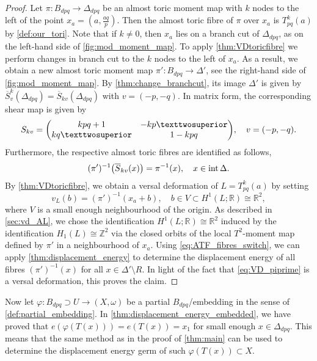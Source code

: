 \documentclass[12pt,a4paper,abstract=true,final]{scrartcl}
\begin{document}
\begin{proof}
    Let $\pi \colon B_{dpq} \rightarrow \Delta_{dpq}$ be an almost toric moment map with $k$ nodes to the left of the point $x_a =\left( a, \frac{aq}{p}\right)$.
Then the almost toric fibre of $\pi$ over $x_a$ is $T^k_{pq}(a)$ by \cref{def:our_tori}.
Note that if $k \neq 0$, then $x_a$ lies on a branch cut of $\Delta_{dpq}$, as on the left-hand side of \cref{fig:mod_moment_map}.
To apply \cref{thm:VDtoricfibre} we perform changes in branch cut to the $k$ nodes to the left of $x_a$.
As a result, we obtain a new almost toric moment map $\pi' \colon B_{dpq} \rightarrow \Delta'$, see the right-hand side of \cref{fig:mod_moment_map}.
By \cref{thm:change_branchcut}, its image $\Delta'$ is given by $\overline{S}_v^k (\Delta_{dpq}) = \overline{S}_{kv}(\Delta_{dpq})$ with $v = (-p,-q)$.
In matrix form, the corresponding shear map is given by 
    \begin{equation}
        \label{eq:displacement_energy_germ}
        S_{kv} = 
        \mqty(kpq+1 & -kp²\\ kq² & 1-kpq), \quad
        v = (-p,-q).
    \end{equation}
    Furthermore, the respective almost toric fibres are identified as follows,
    \begin{equation}
        \label{eq:ATF_fibres_switch}
        (\pi')^{-1}\qty(\overline{S}_{kv}(x)) = \pi^{-1}(x), \quad
        x \in \operatorname{int} \Delta.
    \end{equation}
    By \cref{thm:VDtoricfibre}, we obtain a versal deformation of $L =T^k_{pq}(a)$ by setting
    \begin{equation}
        \label{eq:VD_piprime}
        v_L(b) = (\pi')^{-1}(x_a + b), \quad
        b \in V \subset H^1(L; \mathbb{R}) \cong \mathbb{R}^2,
    \end{equation}
    where $V$ is a small enough neighbourhood of the origin.
As described in \cref{sec:vd_AL}, we chose the identification $H^1(L; \mathbb{R}) \cong \mathbb{R}^2$ induced by the identification $H_1(L) \cong \mathbb{Z}^2$ via the closed orbits of the local $T^2$-moment map defined by $\pi'$ in a neighbourhood of $x_a$.
Using \eqref{eq:ATF_fibres_switch}, we can apply \cref{thm:displacement_energy} to determine the displacement energy of all fibres $(\pi')^{-1}(x)$ for all $x \in \Delta' \setminus R$.
In light of the fact that \eqref{eq:VD_piprime} is a versal deformation, this proves the claim.
\end{proof}

Now let $\varphi \colon B_{dpq} \supset U \rightarrow (X,\omega)$ be a partial $B_{dpq}$\-/embedding in the sense of \cref{def:partial_embedding}.
In \cref{thm:displacement_energy_embedded}, we have proved that $e(\varphi(T(x))) = e(T(x)) = x_1$ for small enough $x \in \Delta_{dpq}$.
This means that the same method as in the proof of \cref{thm:main} can be used to determine the displacement energy germ of such $\varphi(T(x)) \subset X$. 
\end{document}
